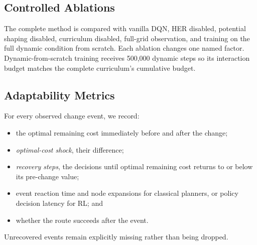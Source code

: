 \subsection{Controlled Ablations}

The complete method is compared with vanilla DQN, HER disabled, potential
shaping disabled, curriculum disabled, full-grid observation, and training on
the full dynamic condition from scratch. Each ablation changes one named
factor. Dynamic-from-scratch training receives 500,000 dynamic steps so its
interaction budget matches the complete curriculum's cumulative budget.

\subsection{Adaptability Metrics}
\label{sec:adaptability}

For every observed change event, we record:
\begin{itemize}
    \item the optimal remaining cost immediately before and after the change;
    \item \emph{optimal-cost shock}, their difference;
    \item \emph{recovery steps}, the decisions until optimal remaining cost
    returns to or below its pre-change value;
    \item event reaction time and node expansions for classical planners, or
    policy decision latency for RL; and
    \item whether the route succeeds after the event.
\end{itemize}
Unrecovered events remain explicitly missing rather than being dropped.
